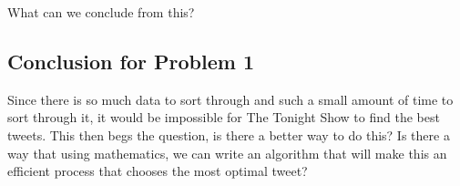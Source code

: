 \documentclass[titlepage]{article}
\begin{document}
What can we conclude from this?


\subsection{Conclusion for Problem 1}

Since there is so much data to sort through and such a small amount of time to sort through it, it would be impossible for The Tonight Show to find the best tweets. This then begs the question, is there a better way to do this? Is there a way that using mathematics, we can write an algorithm that will make this an efficient process that chooses the most optimal tweet? 
\end{document}
